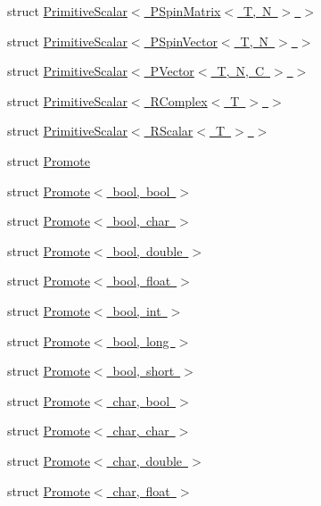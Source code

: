 \begin{DoxyCompactItemize}
struct \mbox{\hyperlink{structENSEM_1_1PrimitiveScalar_3_01PSpinMatrix_3_01T_00_01N_01_4_01_4}{Primitive\+Scalar$<$ P\+Spin\+Matrix$<$ T, N $>$ $>$}}
\item 
struct \mbox{\hyperlink{structENSEM_1_1PrimitiveScalar_3_01PSpinVector_3_01T_00_01N_01_4_01_4}{Primitive\+Scalar$<$ P\+Spin\+Vector$<$ T, N $>$ $>$}}
\item 
struct \mbox{\hyperlink{structENSEM_1_1PrimitiveScalar_3_01PVector_3_01T_00_01N_00_01C_01_4_01_4}{Primitive\+Scalar$<$ P\+Vector$<$ T, N, C $>$ $>$}}
\item 
struct \mbox{\hyperlink{structENSEM_1_1PrimitiveScalar_3_01RComplex_3_01T_01_4_01_4}{Primitive\+Scalar$<$ R\+Complex$<$ T $>$ $>$}}
\item 
struct \mbox{\hyperlink{structENSEM_1_1PrimitiveScalar_3_01RScalar_3_01T_01_4_01_4}{Primitive\+Scalar$<$ R\+Scalar$<$ T $>$ $>$}}
\item 
struct \mbox{\hyperlink{structENSEM_1_1Promote}{Promote}}
\item 
struct \mbox{\hyperlink{structENSEM_1_1Promote_3_01bool_00_01bool_01_4}{Promote$<$ bool, bool $>$}}
\item 
struct \mbox{\hyperlink{structENSEM_1_1Promote_3_01bool_00_01char_01_4}{Promote$<$ bool, char $>$}}
\item 
struct \mbox{\hyperlink{structENSEM_1_1Promote_3_01bool_00_01double_01_4}{Promote$<$ bool, double $>$}}
\item 
struct \mbox{\hyperlink{structENSEM_1_1Promote_3_01bool_00_01float_01_4}{Promote$<$ bool, float $>$}}
\item 
struct \mbox{\hyperlink{structENSEM_1_1Promote_3_01bool_00_01int_01_4}{Promote$<$ bool, int $>$}}
\item 
struct \mbox{\hyperlink{structENSEM_1_1Promote_3_01bool_00_01long_01_4}{Promote$<$ bool, long $>$}}
\item 
struct \mbox{\hyperlink{structENSEM_1_1Promote_3_01bool_00_01short_01_4}{Promote$<$ bool, short $>$}}
\item 
struct \mbox{\hyperlink{structENSEM_1_1Promote_3_01char_00_01bool_01_4}{Promote$<$ char, bool $>$}}
\item 
struct \mbox{\hyperlink{structENSEM_1_1Promote_3_01char_00_01char_01_4}{Promote$<$ char, char $>$}}
\item 
struct \mbox{\hyperlink{structENSEM_1_1Promote_3_01char_00_01double_01_4}{Promote$<$ char, double $>$}}
\item 
struct \mbox{\hyperlink{structENSEM_1_1Promote_3_01char_00_01float_01_4}{Promote$<$ char, float $>$}}

\end{DoxyCompactItemize}
